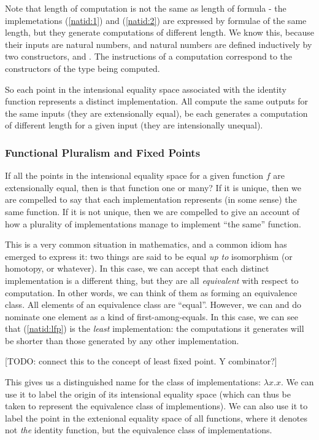\documentclass{article}
\begin{document}
Note that length of computation is not the same as length of formula -
the implemetations (\ref{natid:1}) and (\ref{natid:2}) are expressed
by formulae of the same length, but they generate computations of
different length. We know this, because their inputs are natural
numbers, and natural numbers are defined inductively by two
constructors, \ZNat and \SNat. The instructions of a computation
correspond to the constructors of the type being computed.

So each point in the intensional equality space associated with the
identity function represents a distinct implementation. All compute
the same outputs for the same inputs (they are extensionally equal),
be each generates a computation of different length for a given input
(they are intensionally unequal).

\subsubsection{Functional Pluralism and Fixed Points}

If all the points in the intensional equality space for a given
function \(f\) are extensionally equal, then is that function one or
many? If it is unique, then we are compelled to say that each
implementation represents (in some sense) the same function. If it is
not unique, then we are compelled to give an account of how a
plurality of implementations manage to implement ``the same''
function.

This is a very common situation in mathematics, and a common idiom has
emerged to express it: two things are said to be equal \textit{up to}
isomorphism (or homotopy, or whatever). In this case, we can accept
that each distinct implementation is a different thing, but they are
all \textit{equivalent} with respect to computation. In other words,
we can think of them as forming an equivalence class. All elements of
an equivalence class are ``equal''. However, we can and do nominate
one element as a kind of first-among-equals. In this case, we can see
that (\ref{natid:lfp}) is the \textit{least} implementation: the
computations it generates will be shorter than those generated by any
other implementation.

[TODO: connect this to the concept of least fixed point. Y combinator?]

This gives us a distinguished name for the class of implementations:
\(\lambda x.x\). We can use it to label the origin of its intensional
equality space (which can thus be taken to represent the equivalence
class of implementions). We can also use it to label the point in the
extenional equality space of all functions, where it denotes not
\textit{the} identity function, but the equivalence class of
implementations.
\end{document}
